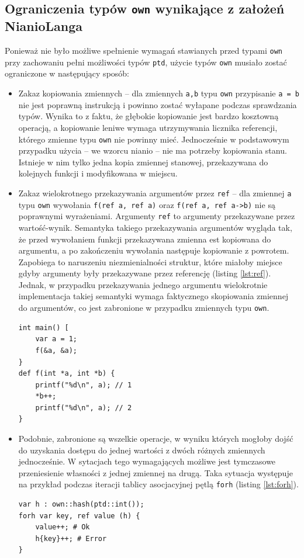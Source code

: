 \documentclass[licencjacka]{pracamgr}
\begin{document}
\subsection{Ograniczenia typów \texttt{own} wynikające z założeń NianioLanga}
Ponieważ nie było możliwe spełnienie wymagań stawianych przed typami \texttt{own} przy zachowaniu pełni
możliwości typów \texttt{ptd}, użycie typów \texttt{own} musiało zostać ograniczone w następujący sposób:
\begin{itemize}
 \item Zakaz kopiowania zmiennych -- dla zmiennych \texttt{a,b} typu \texttt{own} przypisanie
 \texttt{a = b} nie jest poprawną instrukcją i powinno zostać wyłapane podczas sprawdzania typów.
 Wynika to z faktu, że głębokie kopiowanie jest bardzo kosztowną operacją, a kopiowanie leniwe wymaga
 utrzymywania licznika referencji, którego zmienne typu \texttt{own} nie powinny mieć.
 Jednocześnie w podstawowym przypadku użycia -- we wzorcu nianio -- nie ma potrzeby kopiowania stanu.
 Istnieje w nim tylko jedna kopia zmiennej stanowej, przekazywana do kolejnych funkcji i modyfikowana w miejscu.
 \item Zakaz wielokrotnego przekazywania argumentów przez \texttt{ref} -- dla zmiennej \texttt{a} typu
 \texttt{own} wywołania \texttt{f(ref a, ref a)} oraz \texttt{f(ref a, ref a->b)} nie są poprawnymi wyrażeniami.
 Argumenty \texttt{ref} to argumenty przekazywane przez wartość-wynik.
 Semantyka takiego przekazywania argumentów wygląda tak, że przed wywołaniem funkcji przekazywana zmienna
 est kopiowana do argumentu, a po zakończeniu wywołania następuje kopiowanie z powrotem.
 Zapobiega to naruszeniu niezmienialności struktur,
 które miałoby miejsce gdyby argumenty były przekazywane przez referencję (listing \ref{lst:ref}).
 Jednak, w przypadku przekazywania jednego argumentu wielokrotnie implementacja takiej semantyki wymaga
 faktycznego skopiowania zmiennej do argumentów, co jest zabronione w przypadku zmiennych typu \texttt{own}.
\begin{lstlisting}[caption={Naruszenie niezmienialności wartości w C},label={lst:ref}]
int main() [
	var a = 1;
	f(&a, &a);
}
def f(int *a, int *b) {
	printf("%d\n", a); // 1
	*b++;
	printf("%d\n", a); // 2
}
\end{lstlisting}
 \item Podobnie, zabronione są wszelkie operacje, w wyniku których mogłoby dojść do uzyskania dostępu
 do jednej wartości z dwóch różnych zmiennych jednocześnie. W sytacjach tego wymagających możliwe jest tymczasowe
 przeniesienie własności z jednej zmiennej na drugą. Taka sytuacja występuje na przykład podczas iteracji
 tablicy asocjacyjnej pętlą \texttt{forh} (listing \ref{lst:forh}).
\begin{lstlisting}[caption={Odwołanie do zmiennej, która utraciła własność},label={lst:forh}]
var h : own::hash(ptd::int());
forh var key, ref value (h) {
	value++; # Ok
	h{key}++; # Error
}
\end{lstlisting}
\end{itemize}
\end{document}
